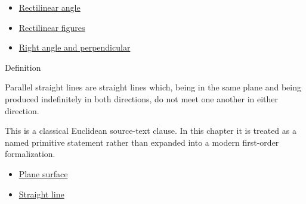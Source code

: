 \begin{lra-not-visible}
\begin{dependencies}
\begin{itemize}
  \item \hyperref[def:euclid-rectilinear-angle]{Rectilinear angle}
  \item \hyperref[def:euclid-rectilinear-figures]{Rectilinear figures}
  \item \hyperref[def:euclid-right-angle-and-perpendicular]{Right angle and perpendicular}
\end{itemize}
\end{dependencies}
\end{lra-not-visible}

\begin{definitionbox}{Definition}
\begin{definition}
\label{def:euclid-parallel-straight-lines}
Parallel straight lines are straight lines which, being in the same plane and
being produced indefinitely in both directions, do not meet one another in
either direction.
\end{definition}
\end{definitionbox}
\begin{remark*}
This is a classical Euclidean source-text clause. In this chapter it is treated
as a named primitive statement rather than expanded into a modern first-order
formalization.
\end{remark*}

\begin{lra-not-visible}
\begin{dependencies}
\begin{itemize}
  \item \hyperref[def:euclid-plane-surface]{Plane surface}
  \item \hyperref[def:euclid-straight-line]{Straight line}
\end{itemize}
\end{dependencies}
\end{lra-not-visible}


